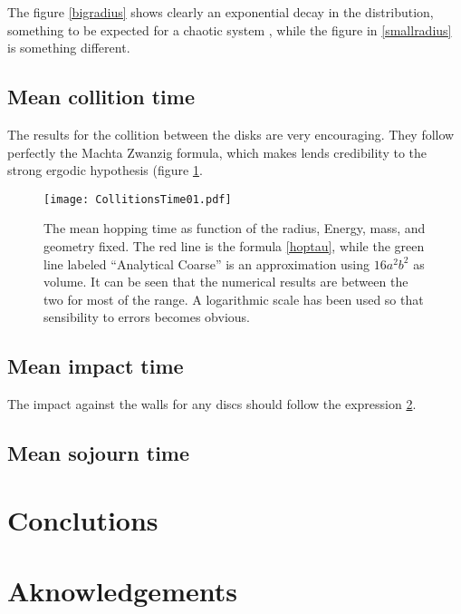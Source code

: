 \documentclass[a4paper,10pt, jcp, aps, preprint]{revtex4-1}
\begin{document}
The figure \ref{bigradius} shows clearly an exponential decay in the
distribution, something to be expected for a chaotic system \cite{OttLibro} , while the
figure in \ref{smallradius} is something different. 

\subsection{Mean collition time}

The results for the collition between the disks are very encouraging. They follow
perfectly the Machta Zwanzig formula, which makes lends credibility to the
strong ergodic hypothesis (figure \ref{MeanColl01}.

\begin{figure}[h]
  \centering
  \texttt{[image: CollitionsTime01.pdf]}
  \caption{The mean hopping time as function of the radius, Energy, mass, 
    and geometry fixed.
    The red line is the formula \ref{hoptau}, while the green line
    labeled ``Analytical Coarse'' is an approximation using
    $16a^2b^2$ as volume. It can be seen that the numerical results
    are between the two for most of the range.
    A logarithmic scale
    has been used so that sensibility to errors becomes obvious.}\label{MeanColl01}
\end{figure}
 

\subsection{Mean impact time}

The impact against the walls for any discs should follow the expression \ref{}. 

\subsection{Mean sojourn time}


\section{Conclutions}

\section{Aknowledgements}



\end{document}
